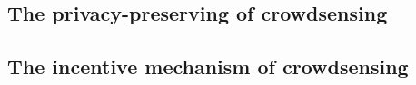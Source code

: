 
\subsection{The privacy-preserving of crowdsensing}

\subsection{The incentive mechanism of crowdsensing}

